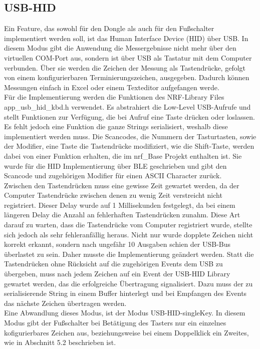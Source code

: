 \subsection{USB-HID}
Ein Feature, das sowohl für den Dongle als auch für den Fußschalter implementiert werden soll, ist das Human Interface Device (HID) über USB. In diesem Modus gibt die Anwendung die Messergebnisse nicht mehr über den virtuellen COM-Port aus, sondern ist über USB als Tastatur mit dem Computer verbunden. Über sie werden die Zeichen der Messung als Tastendrücke, gefolgt von einem konfigurierbaren Terminierungszeichen, ausgegeben. Dadurch können Messungen einfach in Excel oder einem Texteditor aufgefangen werde.\\
Für die Implementierung werden die Funktionen des NRF-Library Files app\_usb\_hid\_kbd.h verwendet. Es abstrahiert die Low-Level USB-Aufrufe und stellt Funktionen zur Verfügung, die bei Aufruf eine Taste drücken oder loslassen. Es fehlt jedoch eine Funktion die ganze Strings serialisiert, weshalb diese implementiert werden muss. Die Scancodes, die Nummern der Tasturtasten, sowie der Modifier, eine Taste die Tastendrücke modifiziert, wie die Shift-Taste, werden dabei von einer Funktion erhalten, die im nrf\_Base Projekt enthalten ist. Sie wurde für die \ac{HID} Implementierung über \ac{BLE} geschrieben und gibt den Scancode und zugehörigen Modifier für einen \ac{ASCII} Character zurück.\\
Zwischen den Tastendrücken muss eine gewisse Zeit gewartet werden, da der Computer Tastendrücke zwischen denen zu wenig Zeit verstreicht nicht registriert. Dieser Delay wurde auf 1 Millisekunden festgelegt, da bei einem längeren Delay die Anzahl an fehlerhaften Tastendrücken zunahm. Diese Art darauf zu warten, dass die Tastendrücke vom Computer registriert wurde, stellte sich jedoch als sehr fehleranfällig heraus. Nicht nur wurde dopplete Zeichen nicht korrekt erkannt, sondern nach ungefähr 10 Ausgaben schien der USB-Bus überlastet zu sein. Daher musste die Implementierung geändert werden. Statt die Tastendrücken ohne Rücksicht auf die zugehörigen Events dem USB zu übergeben, muss nach jedem Zeichen auf ein Event der USB-\ac{HID} Library gewartet werden, das die erfolgreiche Übertragung signalisiert. Dazu muss der zu serialisierende String in einem Buffer hinterlegt und bei Empfangen des Events das nächste Zeichen übertragen werden.\\
Eine Abwandlung dieses Modus, ist der Modus USB-\ac{HID}-singleKey. In diesem Modus gibt der Fußschalter bei Betätigung des Tasters nur ein einzelnes kofigurierbares Zeichen aus, beziehungsweise bei einem Doppelklick ein Zweites, wie in Abschnitt 5.2 beschrieben ist.

